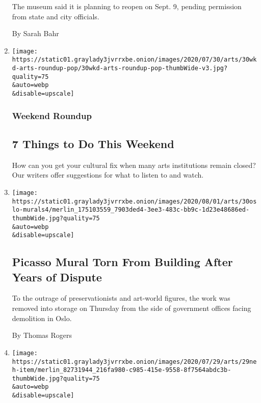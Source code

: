 \begin{enumerate}
  The museum said it is planning to reopen on Sept. 9, pending
  permission from state and city officials.

  By Sarah Bahr
\item
  \href{/2020/07/30/arts/things-to-do-weekend-coronavirus.html}{}

  \texttt{[image: https://static01.graylady3jvrrxbe.onion/images/2020/07/30/arts/30wkd-arts-roundup-pop/30wkd-arts-roundup-pop-thumbWide-v3.jpg?quality=75\\\&auto=webp\\\&disable=upscale]}

  \hypertarget{weekend-roundup}{%
  \subsubsection{Weekend Roundup}\label{weekend-roundup}}

  \hypertarget{7-things-to-do-this-weekend}{%
  \subsection{7 Things to Do This
  Weekend}\label{7-things-to-do-this-weekend}}

  How can you get your cultural fix when many arts institutions remain
  closed? Our writers offer suggestions for what to listen to and watch.
\item
  \href{/2020/07/30/arts/design/picasso-fishermen-mural-norway.html}{}

  \texttt{[image: https://static01.graylady3jvrrxbe.onion/images/2020/08/01/arts/30oslo-murals4/merlin\_175103559\_7903ded4-3ee3-483c-bb9c-1d23e48686ed-thumbWide.jpg?quality=75\\\&auto=webp\\\&disable=upscale]}

  \hypertarget{picasso-mural-torn-from-building-after-years-of-dispute}{%
  \subsection{Picasso Mural Torn From Building After Years of
  Dispute}\label{picasso-mural-torn-from-building-after-years-of-dispute}}

  To the outrage of preservationists and art-world figures, the work was
  removed into storage on Thursday from the side of government offices
  facing demolition in Oslo.

  By Thomas Rogers
\item
  \href{/2020/07/29/arts/national-endowment-for-the-humanities-grants.html}{}

  \texttt{[image: https://static01.graylady3jvrrxbe.onion/images/2020/07/29/arts/29neh-item/merlin\_82731944\_216fa980-c985-415e-9558-8f7564abdc3b-thumbWide.jpg?quality=75\\\&auto=webp\\\&disable=upscale]}


\end{enumerate}
